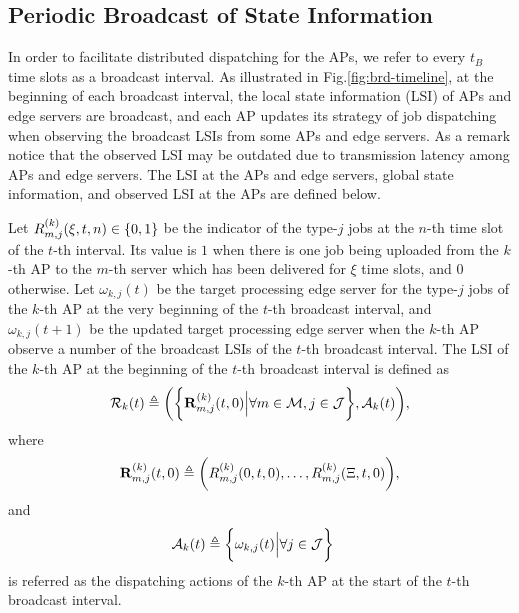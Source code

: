 \subsection{Periodic Broadcast of State Information}
\label{subsec:broadcast}
In order to facilitate distributed dispatching for the APs, we refer to every $t_B$ time slots as a broadcast interval.
As illustrated in Fig.\ref{fig:brd-timeline}, at the beginning of each broadcast interval, the local state information (LSI) of APs and edge servers are broadcast, and each AP updates its strategy of job dispatching when {observing} the broadcast LSIs {from some APs and edge servers. As a remark notice that the observed LSI may be outdated due to transmission latency among APs and edge servers.}
The LSI at the APs and edge servers, global state information, and observed LSI at the APs are defined below.

\begin{definition}
    Let $R^{(k)}_{m,j}(\xi,t,n) \in \{0,1\}$ be the indicator of the type-$j$ jobs at the $n$-th time slot of the $t$-th interval.
    Its value is $1$ when there is one job being uploaded from the $k$-th AP to the $m$-th server which has been delivered for $\xi$ time slots, and $0$ otherwise.
    Let $\omega_{k,j}(t)$ be the target processing edge server for the type-$j$ jobs of the $k$-th AP at the very beginning of the $t$-th broadcast interval, and $\omega_{k,j}(t+1)$ be the updated target processing edge server when the $k$-th AP observe a number of the broadcast LSIs of the $t$-th broadcast interval.
    The LSI of the $k$-th AP at the beginning of the $t$-th broadcast interval is defined as
    {
    \begin{align}
        \mathcal{R}_{k}(t) \triangleq
        \bigg(
            \bigg\{\mathbf{R}^{(k)}_{m,j}(t,0) \Big| \forall m\in\mathcal{M},j\in\mathcal{J}\bigg\},
            \mathcal{A}_{k}(t)
        \bigg),
    \end{align}
    }
    where
    \begin{align}
        \mathbf{R}^{(k)}_{m,j}(t,0) \triangleq \bigg(
            R^{(k)}_{m,j}(0,t,0), \dots, R^{(k)}_{m,j}(\Xi,t,0)
        \bigg),
    \end{align}
    and
    \begin{align}
        \mathcal{A}_{k}(t) &\triangleq \bigg\{\omega_{k,j}(t) \Big| \forall j\in\mathcal{J}\bigg\}
    \end{align}
    is referred as the dispatching actions of the $k$-th AP at the start of the $t$-th broadcast interval.
\end{definition}


